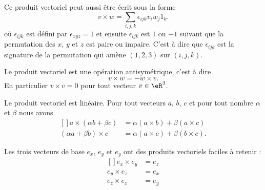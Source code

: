 Ce produit vectoriel peut aussi être écrit sous la forme
\begin{equation}        \label{EqProdVectEspilonijk}
    v\times w=\sum_{i,j,k}\epsilon_{ijk}v_iw_j1_k.
\end{equation}
où $\epsilon_{ijk}$ est défini par $\epsilon_{xyz}=1$ et ensuite $\epsilon_{ijk}$ est $1$ ou $-1$ suivant que la permutation des $x$, $y$ et $z$ est paire ou impaire. C'est à dire que \( \epsilon_{ijk}\) est la signature de la permutation qui amène \( (1,2,3)\) sur \( (i,j,k)\).


\begin{proposition}
    Le produit vectoriel est une opération antisymétrique, c'est à dire
    \begin{equation}
        v\times w=-w\times v.
    \end{equation}
    En particulier $v\times v=0$ pour tout vecteur $v\in\eR^3$.
\end{proposition}

\begin{proposition}
    Le produit vectoriel est linéaire. Pour tout vecteurs $a$, $b$, $c$ et pour tout nombre $\alpha$ et $\beta$ nous avons
    \begin{equation}
        \begin{aligned}[]
            a\times (\alpha b +\beta c)&=\alpha(a\times b)+\beta(a\times c)\\
            (\alpha a+\beta b)\times c&=\alpha(a\times c)+\beta(b\times c).
        \end{aligned}
    \end{equation}
\end{proposition}

Les trois vecteurs de base $e_x$, $e_y$ et $e_y$ ont des produits vectoriels faciles à retenir :
\begin{equation}
    \begin{aligned}[]
        e_x\times e_y&=e_z\\
        e_y\times e_z&=e_x\\
        e_z\times e_x&=e_y
    \end{aligned}
\end{equation}

